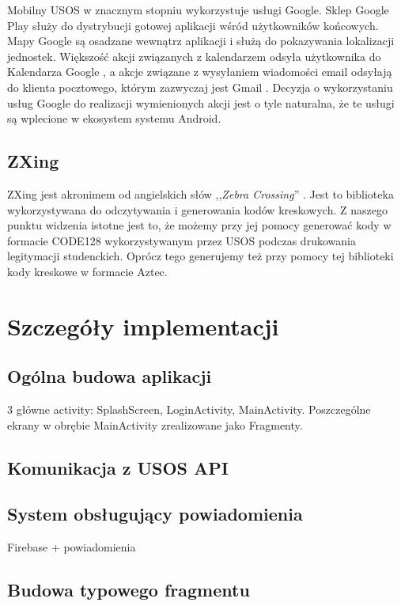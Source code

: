 \documentclass{pracamgr}
\begin{document}
Mobilny USOS w znacznym stopniu wykorzystuje usługi Google. Sklep Google Play
\cite{googleplay} służy do dystrybucji gotowej aplikacji wśród użytkowników
końcowych. Mapy Google \cite{googlemaps} są osadzane wewnątrz aplikacji i służą
do pokazywania lokalizacji jednostek. Większość akcji związanych z kalendarzem
odsyła użytkownika do Kalendarza Google \cite{googlecalendar}, a akcje związane
z wysyłaniem wiadomości email odsyłają do klienta pocztowego, którym zazwyczaj
jest Gmail \cite{gmail}. Decyzja o wykorzystaniu usług Google do realizacji
wymienionych akcji jest o tyle naturalna, że te usługi są wplecione w ekosystem
systemu Android.

\section{ZXing}

ZXing jest akronimem od angielskich słów ,,\textit{Zebra Crossing}'' \cite{zxing}.
Jest to biblioteka wykorzystywana do odczytywania i generowania kodów kreskowych.
Z naszego punktu widzenia istotne jest to, że możemy przy jej pomocy generować
kody w formacie CODE128 wykorzystywanym przez USOS podczas drukowania legitymacji
studenckich. Oprócz tego generujemy też przy pomocy tej biblioteki kody kreskowe
w formacie Aztec.

\chapter{Szczegóły implementacji}

\section{Ogólna budowa aplikacji}

3 główne activity: SplashScreen, LoginActivity, MainActivity.
Poszczególne ekrany w obrębie MainActivity zrealizowane jako
Fragmenty.

\section{Komunikacja z USOS API}

\section{System obsługujący powiadomienia}

Firebase + powiadomienia

\section{Budowa typowego fragmentu}
\end{document}

